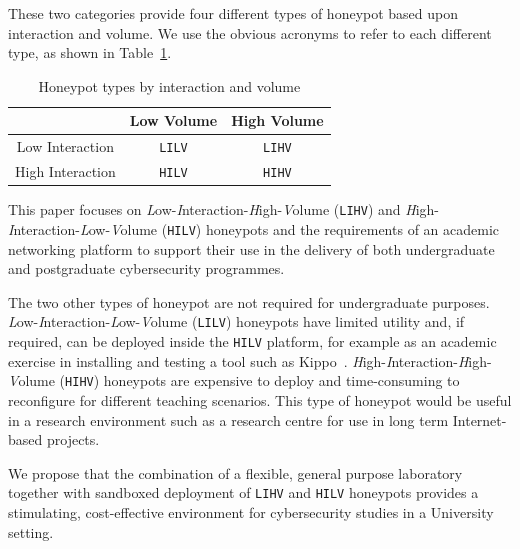 \documentclass[10pt,journal]{IEEEtran}
\begin{document}
These two categories provide four different types of honeypot based upon
interaction and volume. We use the obvious acronyms to refer to each different
type, as shown in Table~\ref{table:HoneypotTypes}.

\begin{table}[h]
\caption{Honeypot types by interaction and volume\label{table:HoneypotTypes}}
\begin{center}
\begin{tabular}{| c | c| c |}
\hline
 & Low Volume & High Volume \\
\hline
Low Interaction & \texttt{LILV} & \texttt{LIHV} \\
\hline
High Interaction & \texttt{HILV} & \texttt{HIHV} \\
\hline
\end{tabular}
\end{center}
\end{table}

This paper focuses on \emph{L}ow-\-\emph{I}nteraction-\-\emph{H}igh-\-\emph{V}olume
(\texttt{LIHV}) and \emph{H}igh- \\ \emph{I}nteraction-\-\emph{L}ow-\-\emph{V}olume
(\texttt{HILV}) honeypots and the requirements of an academic networking
platform to support their use in the delivery of both undergraduate and
postgraduate cybersecurity programmes.

The two other types of honeypot are not required for undergraduate purposes.
\emph{L}ow-\emph{I}nteraction-\emph{L}ow-\emph{V}olume (\texttt{LILV})
honeypots have limited utility and, if required,  can be deployed inside the
\texttt{HILV} platform, for example as an academic exercise in installing and
testing a tool such as Kippo~\cite{SH:15}.
\emph{H}igh-\emph{I}nteraction-\emph{H}igh-\emph{V}olume (\texttt{HIHV})
honeypots are expensive to deploy and time-consuming to reconfigure for
different teaching scenarios. This type of honeypot would be useful in a
research environment such as a research centre for use in long term
Internet-based projects. 

We propose that the combination of a flexible, general purpose laboratory
together with sandboxed deployment of \texttt{LIHV} and \texttt{HILV} honeypots provides 
a stimulating, cost-effective environment for cybersecurity studies
in a University setting.
\end{document}
